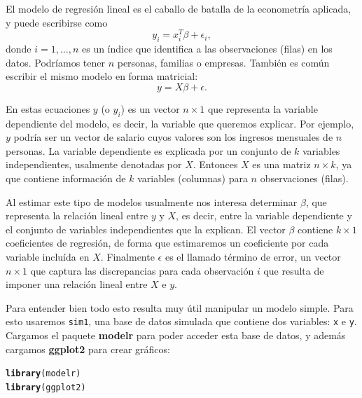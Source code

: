 \documentclass{article}\usepackage[]{graphicx}\usepackage[]{color}
\makeatletter
\newcommand{\hlstd}[1]{\textcolor[rgb]{0.345,0.345,0.345}{#1}}%
\newcommand{\hlkwd}[1]{\textcolor[rgb]{0.737,0.353,0.396}{\textbf{#1}}}%
\newenvironment{kframe}{%
 \def\at@end@of@kframe{}%
 \ifinner\ifhmode%
  \def\at@end@of@kframe{\end{minipage}}%
  \begin{minipage}{\columnwidth}%
 \fi\fi%
 \def\FrameCommand##1{\hskip\@totalleftmargin \hskip-\fboxsep
 \colorbox{shadecolor}{##1}\hskip-\fboxsep
     \hskip-\linewidth \hskip-\@totalleftmargin \hskip\columnwidth}%
 \MakeFramed {\advance\hsize-\width
   \@totalleftmargin\z@ \linewidth\hsize
   \@setminipage}}%
 {\par\unskip\endMakeFramed%
 \at@end@of@kframe}
\newenvironment{knitrout}{}{} %
\newcommand*{\paq}[1]{\textbf{#1}}
\makeatother
\begin{document}
\hrulefill

El modelo de regresión lineal es el caballo de batalla de la econometría aplicada, y puede escribirse como
\begin{equation}
y_i = x_i^T \beta + \epsilon_i,
\end{equation}
donde $i = 1, \ldots, n$ es un índice que identifica a las observaciones (filas) en los datos. Podríamos tener $n$ personas, familias o empresas.
También es común escribir el mismo modelo en forma matricial:
\begin{equation}
y = X \beta + \epsilon.
\end{equation}

En estas ecuaciones $y$ (o $y_i$) es un vector $n \times 1$ que representa la variable dependiente del modelo, es decir, la variable que queremos explicar. Por ejemplo, $y$ podría ser un vector de salario cuyos valores son los ingresos mensuales de $n$ personas.
La variable dependiente es explicada por un conjunto de $k$ variables independientes, usalmente denotadas por $X$. Entonces $X$ es una matriz $n\times k$, ya que contiene información de $k$ variables (columnas) para $n$ observaciones (filas).

Al estimar este tipo de modelos usualmente nos interesa determinar $\beta$, que representa la relación lineal entre $y$ y $X$, es decir, entre la variable dependiente y el conjunto de variables independientes que la explican. El vector $\beta$ contiene $k \times 1$ coeficientes de regresión, de forma que estimaremos un coeficiente por cada variable incluída en $X$.
Finalmente $\epsilon$ es el llamado término de error, un vector $n \times 1$ que captura las discrepancias para cada observación $i$ que resulta de imponer una relación lineal entre $X$ e $y$.

Para entender bien todo esto resulta muy útil manipular un modelo simple. Para esto usaremos \verb|sim1|, una base de datos simulada que contiene dos variables: \verb|x| e \verb|y|. Cargamos el paquete \paq{modelr} para poder acceder esta base de datos, y además cargamos \paq{ggplot2} para crear gráficos:

\begin{knitrout}
\color{fgcolor}\begin{kframe}
\begin{alltt}
\hlkwd{library}\hlstd{(modelr)}
\hlkwd{library}\hlstd{(ggplot2)}
\end{alltt}
\end{kframe}
\end{knitrout}
\end{document}
